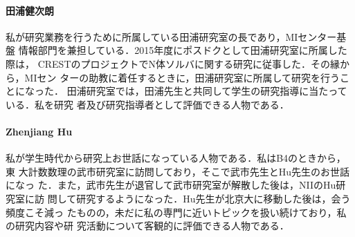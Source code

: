 \documentclass[dvipdfmx]{jsarticle}
\begin{document}
\paragraph{田浦健次朗}
私が研究業務を行うために所属している田浦研究室の長であり，MIセンター基盤
情報部門を兼担している．2015年度にポスドクとして田浦研究室に所属した際は，
CRESTのプロジェクトでN体ソルバに関する研究に従事した．その縁から，MIセン
ターの助教に着任するときに，田浦研究室に所属して研究を行うことになった．
田浦研究室では，田浦先生と共同して学生の研究指導に当たっている．私を研究
者及び研究指導者として評価できる人物である．

\paragraph{Zhenjiang Hu}
私が学生時代から研究上お世話になっている人物である．私はB4のときから，東
大計数数理の武市研究室に訪問しており，そこで武市先生とHu先生のお世話になっ
た．また，武市先生が退官して武市研究室が解散した後は，NIIのHu研究室に訪
問して研究するようになった．Hu先生が北京大に移動した後は，会う頻度こそ減っ
たものの，未だに私の専門に近いトピックを扱い続けており，私の研究内容や研
究活動について客観的に評価できる人物である．
\end{document}
